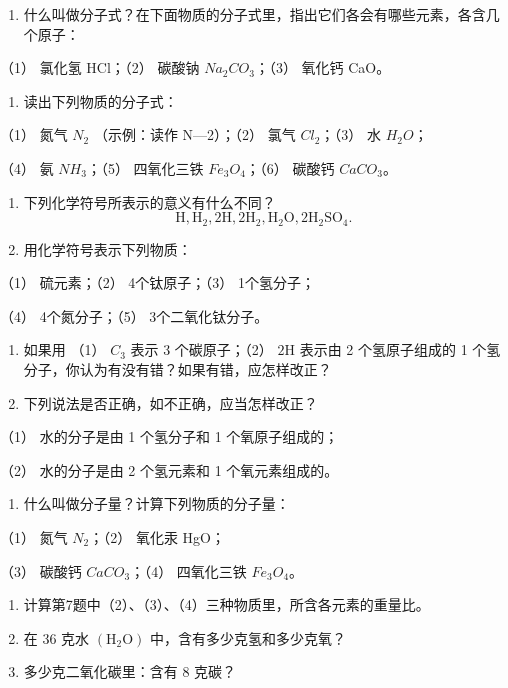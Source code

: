 \begin{enumerate}
\item
  什么叫做分子式？在下面物质的分子式里，指出它们各会有哪些元素，各含几个原子：
\end{enumerate}

（1） 氯化氢 HCl；（2） 碳酸钠 \(Na_{2}CO_{3}\)；（3） 氧化钙 CaO。

\begin{enumerate}[start=2]
\item
  读出下列物质的分子式：
\end{enumerate}

（1） 氮气 \(N_{2}\) （示例：读作 N---2）；（2） 氯气 \(Cl_{2}\)；（3）
水 \(H_{2}O\)；

（4） 氨 \(NH_{3}\)；（5） 四氧化三铁 \(Fe_{3}O_{4}\)；（6） 碳酸钙
\(CaCO_{3}\)。

\begin{enumerate}[start=3]
\item
  下列化学符号所表示的意义有什么不同？
\[
\mathrm{H}, \mathrm{H}_{2}, 2 \mathrm{H}, 2 \mathrm{H}_{2}, \mathrm{H}_{2} \mathrm{O}, 2 \mathrm{H}_{2} \mathrm{SO}_{4}.
\]
\item
  用化学符号表示下列物质：
\end{enumerate}

（1） 硫元素；（2） 4个钛原子；（3） 1个氢分子；

（4） 4个氮分子；（5） 3个二氧化钛分子。

\begin{enumerate}[start=5]
\item
  如果用 （1） \(C_{3}\) 表示 3 个碳原子；（2） \(2\mathrm{H}\) 表示由 2
  个氢原子组成的 1 个氢分子，你认为有没有错？如果有错，应怎样改正？
\item
  下列说法是否正确，如不正确，应当怎样改正？
\end{enumerate}

（1） 水的分子是由 1 个氢分子和 1 个氧原子组成的；

（2） 水的分子是由 2 个氢元素和 1 个氧元素组成的。

\begin{enumerate}[start=7]
\item
  什么叫做分子量？计算下列物质的分子量：
\end{enumerate}

（1） 氮气 \(N_{2}\)；（2） 氧化汞 HgO；

（3） 碳酸钙 \(CaCO_{3}\)；（4） 四氧化三铁 \(Fe_{3}O_{4}\)。

\begin{enumerate}[start=8]
\item
  计算第7题中（2）、（3）、（4）三种物质里，所含各元素的重量比。
\item
  在 36 克水 \(\left(\mathrm{H}_{2}\mathrm{O}\right)\)
  中，含有多少克氢和多少克氧？
\item
  多少克二氧化碳里：含有 8 克碳？
\end{enumerate}

